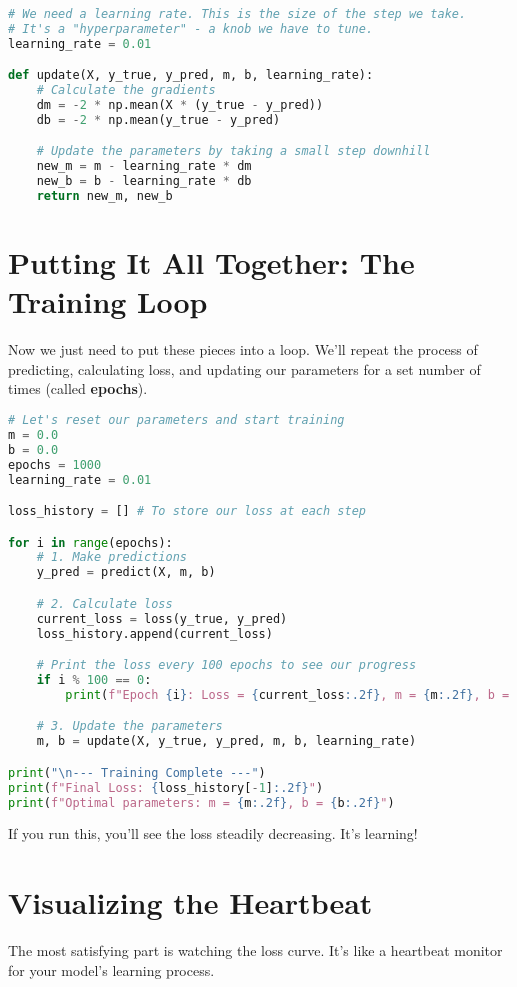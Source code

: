 \documentclass[11pt, letterpaper, openany]{book}
\begin{document}
\begin{lstlisting}[language=Python]
# We need a learning rate. This is the size of the step we take.
# It's a "hyperparameter" - a knob we have to tune.
learning_rate = 0.01

def update(X, y_true, y_pred, m, b, learning_rate):
    # Calculate the gradients
    dm = -2 * np.mean(X * (y_true - y_pred))
    db = -2 * np.mean(y_true - y_pred)

    # Update the parameters by taking a small step downhill
    new_m = m - learning_rate * dm
    new_b = b - learning_rate * db
    return new_m, new_b
\end{lstlisting}

\section{Putting It All Together: The Training Loop}
Now we just need to put these pieces into a loop. We'll repeat the process of predicting, calculating loss, and updating our parameters for a set number of times (called \textbf{epochs}).

\begin{lstlisting}[language=Python]
# Let's reset our parameters and start training
m = 0.0
b = 0.0
epochs = 1000
learning_rate = 0.01

loss_history = [] # To store our loss at each step

for i in range(epochs):
    # 1. Make predictions
    y_pred = predict(X, m, b)

    # 2. Calculate loss
    current_loss = loss(y_true, y_pred)
    loss_history.append(current_loss)

    # Print the loss every 100 epochs to see our progress
    if i % 100 == 0:
        print(f"Epoch {i}: Loss = {current_loss:.2f}, m = {m:.2f}, b = {b:.2f}")

    # 3. Update the parameters
    m, b = update(X, y_true, y_pred, m, b, learning_rate)

print("\n--- Training Complete ---")
print(f"Final Loss: {loss_history[-1]:.2f}")
print(f"Optimal parameters: m = {m:.2f}, b = {b:.2f}")
\end{lstlisting}

If you run this, you'll see the loss steadily decreasing. It's learning!

\section{Visualizing the Heartbeat}
The most satisfying part is watching the loss curve. It's like a heartbeat monitor for your model's learning process.
\end{document}
